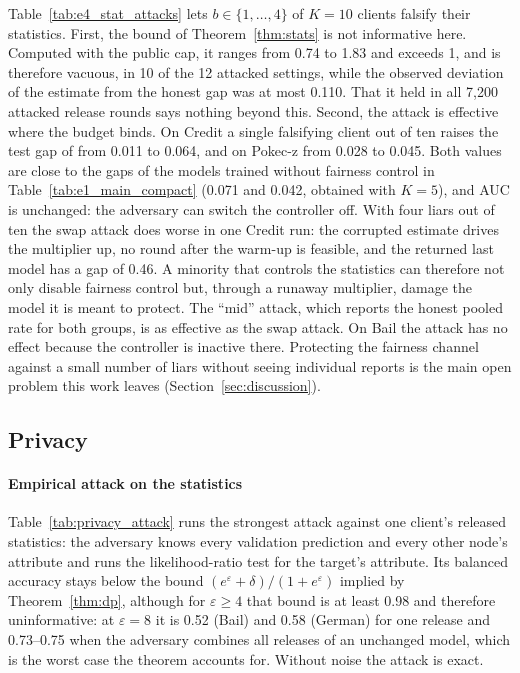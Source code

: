 Table~\ref{tab:e4_stat_attacks} lets $b\in\{1,\dots,4\}$ of $K=10$ clients falsify their statistics. First, the bound of Theorem~\ref{thm:stats} is not informative here. Computed with the public cap, it ranges from 0.74 to 1.83 and exceeds 1, and is therefore vacuous, in 10 of the 12 attacked settings, while the observed deviation of the estimate from the honest gap was at most 0.110. That it held in all 7{,}200 attacked release rounds says nothing beyond this. Second, the attack is effective where the budget binds. On Credit a single falsifying client out of ten raises the test gap of \clamp{} from 0.011 to 0.064, and on Pokec-z from 0.028 to 0.045. Both values are close to the gaps of the models trained without fairness control in Table~\ref{tab:e1_main_compact} (0.071 and 0.042, obtained with $K=5$), and AUC is unchanged: the adversary can switch the controller off. With four liars out of ten the swap attack does worse in one Credit run: the corrupted estimate drives the multiplier up, no round after the warm-up is feasible, and the returned last model has a gap of 0.46. A minority that controls the statistics can therefore not only disable fairness control but, through a runaway multiplier, damage the model it is meant to protect. The ``mid'' attack, which reports the honest pooled rate for both groups, is as effective as the swap attack. On Bail the attack has no effect because the controller is inactive there. Protecting the fairness channel against a small number of liars without seeing individual reports is the main open problem this work leaves (Section~\ref{sec:discussion}).

\subsection{Privacy}\label{sec:privacy}



\paragraph{Empirical attack on the statistics}
Table~\ref{tab:privacy_attack} runs the strongest attack against one client's released statistics: the adversary knows every validation prediction and every other node's attribute and runs the likelihood-ratio test for the target's attribute. Its balanced accuracy stays below the bound $(e^\varepsilon+\delta)/(1+e^\varepsilon)$ implied by Theorem~\ref{thm:dp}, although for $\varepsilon\ge4$ that bound is at least 0.98 and therefore uninformative: at $\varepsilon=8$ it is 0.52 (Bail) and 0.58 (German) for one release and 0.73--0.75 when the adversary combines all releases of an unchanged model, which is the worst case the theorem accounts for. Without noise the attack is exact.

